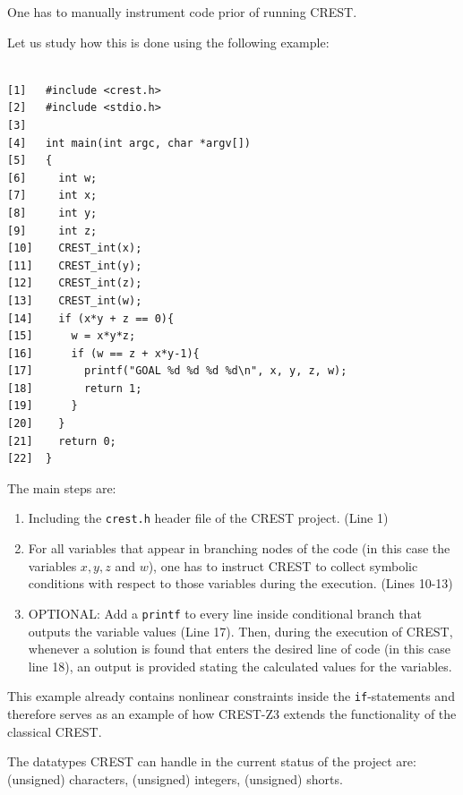 \documentclass[oribibl]{llncs}
\begin{document}
One has to manually instrument code prior of running \textsc{CREST}.

Let us study how this is done using the following example:

\begin{example}
\label{ex:codeForDemo}
\begin{verbatim}

[1]   #include <crest.h>
[2]   #include <stdio.h>
[3]  
[4]   int main(int argc, char *argv[])
[5]   {
[6]     int w;
[7]     int x;
[8]     int y;
[9]     int z;
[10]    CREST_int(x);
[11]    CREST_int(y);
[12]    CREST_int(z);
[13]    CREST_int(w);
[14]    if (x*y + z == 0){
[15]      w = x*y*z;
[16]      if (w == z + x*y-1){
[17]        printf("GOAL %d %d %d %d\n", x, y, z, w);
[18]        return 1;
[19]      }
[20]    }	
[21]    return 0;
[22]  }
\end{verbatim}
\end{example}

The main steps are:
\begin{enumerate}
  \item Including the \texttt{crest.h} header file of the
    \textsc{CREST} project. (Line 1)
   \item For all variables that appear in branching nodes of the code
     (in this case the variables $x,y,z$ and $w$), one has to instruct
     \textsc{CREST} to collect symbolic conditions with respect to
     those variables during the
     execution. (Lines 10-13)
   \item OPTIONAL: Add a
     \texttt{printf} to every line inside conditional branch that
     outputs the variable values (Line 17). Then, during the execution of
     \textsc{CREST}, whenever a solution is found that enters the
     desired line of code (in this case line 18), an output is
     provided stating the calculated values for the variables.
\end{enumerate}

\begin{remark}
  This example already contains nonlinear constraints inside the
  \texttt{if}-statements and therefore serves as an example of how
  \textsc{CREST-Z3} extends the functionality of the classical \textsc{CREST}.
\end{remark}

\begin{remark}
  \label{rmrk:DataTypes}
  The datatypes \textsc{CREST} can handle in the current status of the
  project are: (unsigned) characters, (unsigned) integers, (unsigned) shorts.
\end{remark}
\end{document}
